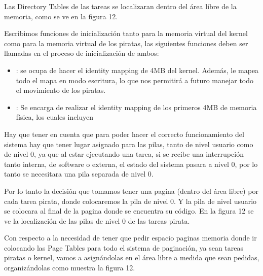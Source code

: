 Las Directory Tables de las tareas se localizaran dentro del área libre de la memoria, como se ve en la figura 12.

Escribimos funciones de inicialización tanto para la memoria virtual del kernel como para la memoria virtual de los piratas, las siguientes funciones deben ser llamadas en el proceso de inicialización de ambos:

\begin{itemize}
\item {}: se ocupa de hacer el identity mapping de 4MB del kernel. Además, le mapea todo el mapa en modo escritura, lo que nos permitirá a futuro manejar todo el movimiento de los piratas.

\item {}: Se encarga de realizar el identity mapping de los primeros 4MB de memoria física, los cuales incluyen 
\end{itemize}

Hay que tener en cuenta que para poder hacer el correcto funcionamiento del sistema hay que tener lugar asignado para las pilas, tanto de nivel usuario como de nivel 0, ya que al estar ejecutando una tarea, si se recibe una interrupción tanto interna, de software o externa, el estado del sistema pasara a nivel 0, por lo tanto se necesitara una pila separada de nivel 0.

Por lo tanto la decisión que tomamos tener una pagina (dentro del área libre) por cada tarea pirata, donde colocaremos la pila de nivel 0. Y la pila de nivel usuario se colocara al final de la pagina donde se encuentra su código. En la figura 12 se ve la localización de las pilas de nivel 0 de las tareas pirata.

Con respecto a la necesidad de tener que pedir espacio paginas memoria donde ir colocando las Page Tables para todo el sistema de paginación, ya sean tareas piratas o kernel, vamos a asignándolas en el área libre a medida que sean pedidas, organizándolas como muestra la figura 12.

